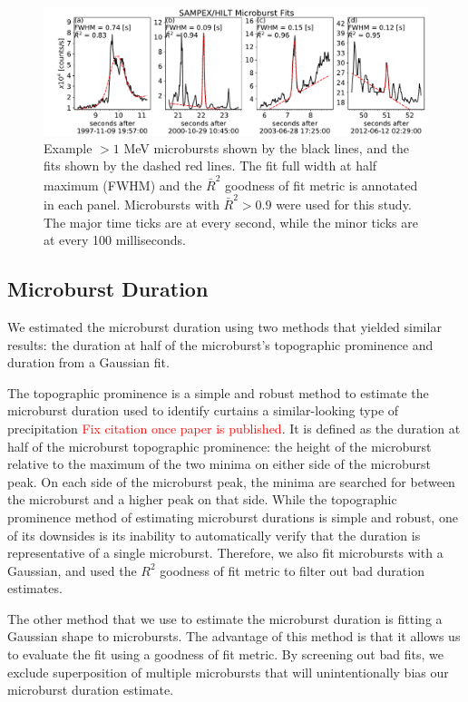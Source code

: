 \documentclass[draft]{agujournal2019}
\begin{document}
\begin{figure}
\noindent\includegraphics[width=\textwidth]{figures/fig1.pdf}
\caption{Example $>1$ MeV microbursts shown by the black lines, and the fits shown by the dashed red lines. The fit full width at half maximum (FWHM) and the $\bar{R}^2$ goodness of fit metric is annotated in each panel. Microbursts with $\bar{R}^2 > 0.9$ were used for this study. The major time ticks are at every second, while the minor ticks are at every 100 milliseconds.}
\label{fig1}
\end{figure}

\subsection{Microburst Duration}
We estimated the microburst duration using two methods that yielded similar results: the duration at half of the microburst's topographic prominence and duration from a Gaussian fit.

The topographic prominence is a simple and robust method to estimate the microburst duration used to identify curtains a similar-looking type of precipitation \cite{Shumko2020b} \textcolor{red}{Fix citation once paper is published}. It is defined as the duration at half of the microburst topographic prominence: the height of the microburst relative to the maximum of the two minima on either side of the microburst peak. On each side of the microburst peak, the minima are searched for between the microburst and a higher peak on that side. While the topographic prominence method of estimating microburst durations is simple and robust, one of its downsides is its inability to automatically verify that the duration is representative of a single microburst. Therefore, we also fit microbursts with a Gaussian, and used the $R^2$ goodness of fit metric to filter out bad duration estimates.

The other method that we use to estimate the microburst duration is fitting a Gaussian shape to microbursts. The advantage of this method is that it allows us to evaluate the fit using a goodness of fit metric. By screening out bad fits, we exclude superposition of multiple microbursts that will unintentionally bias our microburst duration estimate.
\end{document}
